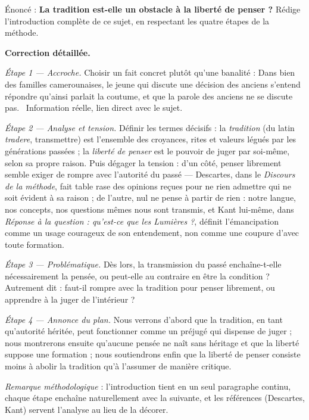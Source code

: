\documentclass[11pt]{article}
\begin{document}
\begin{exoresolu}
Énoncé : \textbf{La tradition est-elle un obstacle à la liberté de penser ?} Rédige l'introduction complète de ce sujet, en respectant les quatre étapes de la méthode.

\tcblower
\textbf{Correction détaillée.}

\emph{Étape 1 — Accroche.} Choisir un fait concret plutôt qu'une banalité : \guillemotleft Dans bien des familles camerounaises, le jeune qui discute une décision des anciens s'entend répondre qu'ainsi parlait la coutume, et que la parole des anciens ne se discute pas. \guillemotright\ Information réelle, lien direct avec le sujet.

\emph{Étape 2 — Analyse et tension.} Définir les termes décisifs : la \emph{tradition} (du latin \emph{tradere}, transmettre) est l'ensemble des croyances, rites et valeurs légués par les générations passées ; la \emph{liberté de penser} est le pouvoir de juger par soi-même, selon sa propre raison. Puis dégager la tension : d'un côté, penser librement semble exiger de rompre avec l'autorité du passé — Descartes, dans le \emph{Discours de la méthode}, fait table rase des opinions reçues pour ne rien admettre qui ne soit évident à sa raison ; de l'autre, nul ne pense à partir de rien : notre langue, nos concepts, nos questions mêmes nous sont transmis, et Kant lui-même, dans \emph{Réponse à la question : qu'est-ce que les Lumières ?}, définit l'émancipation comme un usage courageux de son entendement, non comme une coupure d'avec toute formation.

\emph{Étape 3 — Problématique.} \guillemotleft Dès lors, la transmission du passé enchaîne-t-elle nécessairement la pensée, ou peut-elle au contraire en être la condition ? Autrement dit : faut-il rompre avec la tradition pour penser librement, ou apprendre à la juger de l'intérieur ? \guillemotright

\emph{Étape 4 — Annonce du plan.} \guillemotleft Nous verrons d'abord que la tradition, en tant qu'autorité héritée, peut fonctionner comme un préjugé qui dispense de juger ; nous montrerons ensuite qu'aucune pensée ne naît sans héritage et que la liberté suppose une formation ; nous soutiendrons enfin que la liberté de penser consiste moins à abolir la tradition qu'à l'assumer de manière critique. \guillemotright

\emph{Remarque méthodologique} : l'introduction tient en un seul paragraphe continu, chaque étape enchaîne naturellement avec la suivante, et les références (Descartes, Kant) servent l'analyse au lieu de la décorer.
\end{exoresolu}
\end{document}
